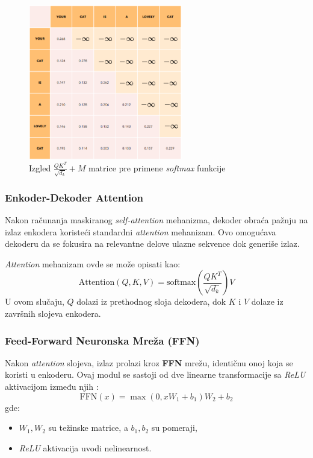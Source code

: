 \documentclass[12pt]{article}
\begin{document}
   \begin{figure}[h!]
      \centering
      \includegraphics[width=0.6\textwidth]{masked_attention.png}
      \caption{Izgled $\frac{QK^T}{\sqrt{d_k}} + M$ matrice pre primene \textit{softmax} funkcije \cite{transformer}}
      \label{fig:masked_attention}
   \end{figure}

   \subsubsection*{Enkoder-Dekoder Attention}

   Nakon računanja maskiranog \textit{self-attention} mehanizma, dekoder obraća pažnju na 
   izlaz enkodera koristeći standardni \textit{attention} mehanizam. Ovo omogućava dekoderu da 
   se fokusira na relevantne delove ulazne sekvence dok generiše izlaz.

   \textit{Attention} mehanizam ovde se može opisati kao:
   \[
   \text{Attention}(Q, K, V) = \text{softmax}\left(\frac{QK^T}{\sqrt{d_k}}\right)V
   \]
   U ovom slučaju, \( Q \) dolazi iz prethodnog sloja dekodera, dok \( K \) i \( V \) 
   dolaze iz završnih slojeva enkodera.

   \subsubsection*{Feed-Forward Neuronska Mreža (FFN)}
   Nakon \textit{attention} slojeva, izlaz prolazi kroz \textbf{FFN} mrežu, 
   identičnu onoj koja se koristi u enkoderu. Ovaj modul se sastoji od dve 
   linearne transformacije sa \textit{ReLU} aktivacijom između njih \cite{attentionneed}:
   \[
   \text{FFN}(x) = \max(0, xW_1 + b_1)W_2 + b_2
   \]
   gde:
   \begin{itemize}
      \item \( W_1, W_2 \) su težinske matrice, a \( b_1, b_2 \) su pomeraji,
      \item \textit{ReLU} aktivacija uvodi nelinearnost.
   \end{itemize}
\end{document}
